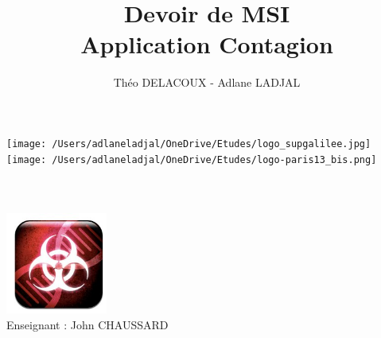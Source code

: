 \documentclass[11pt,a4paper]{article}
\author{Théo DELACOUX - Adlane LADJAL}
\title{Devoir de MSI \\ Application Contagion}
\begin{document}
\makeatletter
\begin{titlepage}
	\centering
	\texttt{[image: /Users/adlaneladjal/OneDrive/Etudes/logo\_supgalilee.jpg]}
	\hfill
	\texttt{[image: /Users/adlaneladjal/OneDrive/Etudes/logo-paris13\_bis.png]} \\
    \vspace{5cm}
       {\LARGE \textbf{\@title}} \\
    \vspace{2em}
        {\large \@author }\\
    \vspace{1em}
        {\textit{\@date}} \\
    \vspace{2em}
    		\includegraphics[width=0.25\textwidth]{contagion-logo.jpg}\\
    	\vspace{2em}
    		{Enseignant : John CHAUSSARD} \\
    \vfill
\end{titlepage}
\end{document}
